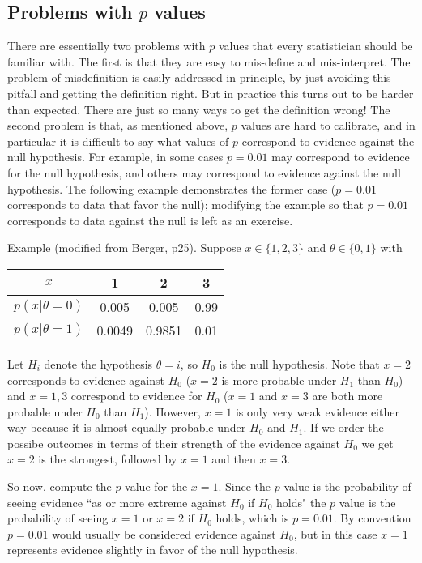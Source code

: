 \documentclass[times,11pt]{article}
\begin{document}
\subsection*{Problems with $p$ values}

There are essentially two problems with $p$ values that every statistician should be familiar with.
The first is that they are easy to mis-define and mis-interpret. The problem of misdefinition
is easily addressed in principle, by just avoiding this pitfall and getting the definition right. 
But in practice this turns out to be harder than expected. There are just so many ways to get the definition wrong!
The second problem is that, as mentioned above, $p$ values are hard to calibrate, and in particular
it is difficult to say what values of $p$ correspond to evidence against the null hypothesis. 
For example, in some cases $p=0.01$ may correspond to evidence for the null hypothesis,
and others may correspond to evidence against the null hypothesis. The following example demonstrates
the former case ($p=0.01$ corresponds to data that favor the null); modifying the example
so that $p=0.01$ corresponds to data against the null is left as an exercise.

Example (modified from Berger, p25). Suppose $x \in \{1,2,3\}$ and $\theta \in \{0,1\}$
with 
\begin{table}[h!]
\center
\begin{tabular}{c|c|c|c}
$x$ & 1 & 2 & 3 \\ \hline
$p(x|\theta=0)$ & 0.005 & 0.005 & 0.99 \\
$p(x|\theta=1)$ & 0.0049 & 0.9851 & 0.01 
\end{tabular}
\end{table}

Let $H_i$ denote the hypothesis $\theta=i$, so $H_0$ is the null hypothesis.
Note that $x=2$ corresponds to evidence against $H_0$ ($x=2$ is more probable under $H_1$ than $H_0$)
and $x=1,3$ correspond to evidence for $H_0$ ($x=1$ and $x=3$ are both more probable under $H_0$ than $H_1$).
However, $x=1$ is only very weak evidence either way because it is almost equally probable under $H_0$ and $H_1$.
If we order the possibe outcomes in terms of their strength of the evidence against $H_0$ we get $x=2$ is the strongest,
followed by $x=1$ and then $x=3$.

So now, compute the $p$ value for the $x=1$.
Since the $p$ value is the probability of seeing evidence ``as or more extreme against $H_0$ if $H_0$ holds" the
$p$ value is the probability of seeing $x=1$ or $x=2$ if $H_0$ holds, which is $p=0.01$. By convention $p=0.01$ 
would usually be considered
evidence against $H_0$, but in this case $x=1$ represents evidence slightly in favor of the null hypothesis.
\end{document}
